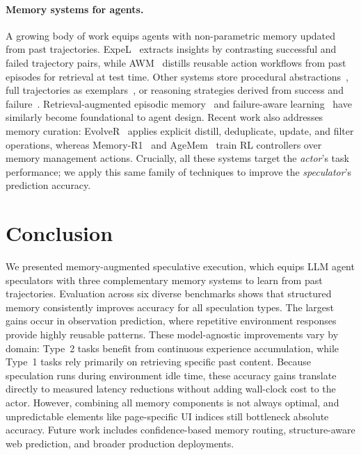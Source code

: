 \documentclass{article}
\begin{document}
\paragraph{Memory systems for agents.}
\label{sec:related:memory}
A growing body of work equips agents with non-parametric memory updated from past trajectories. ExpeL~\citep{zhao2024expel} extracts insights by contrasting successful and failed trajectory pairs, while AWM~\citep{wang2024awm} distills reusable action workflows from past episodes for retrieval at test time. Other systems store procedural abstractions~\citep{fang2025memp,wang2023voyager}, full trajectories as exemplars~\citep{zheng2024synapse,kagaya2024rap,sarukkai2025self}, or reasoning strategies derived from success and failure~\citep{ouyang2025reasoningbank}. Retrieval-augmented episodic memory~\citep{lewis2020rag,park2023generative,majumder2023clin,zhang2026memrl} and failure-aware learning~\citep{shinn2023reflexion,ding2026agenther,allard2026erl} have similarly become foundational to agent design. Recent work also addresses memory curation: EvolveR~\citep{wu2025evolver} applies explicit distill, deduplicate, update, and filter operations, whereas Memory-R1~\citep{yan2025memory} and AgeMem~\citep{yu2026agentic} train RL controllers over memory management actions. Crucially, all these systems target the \emph{actor}'s task performance; we apply this same family of techniques to improve the \emph{speculator}'s prediction accuracy.


\section{Conclusion}
\label{sec:conclusion}
We presented memory-augmented speculative execution, which equips LLM agent speculators with three complementary memory systems to learn from past trajectories. Evaluation across six diverse benchmarks shows that structured memory consistently improves accuracy for all speculation types. The largest gains occur in observation prediction, where repetitive environment responses provide highly reusable patterns. These model-agnostic improvements vary by domain: Type~2 tasks benefit from continuous experience accumulation, while Type~1 tasks rely primarily on retrieving specific past content. Because speculation runs during environment idle time, these accuracy gains translate directly to measured latency reductions without adding wall-clock cost to the actor. However, combining all memory components is not always optimal, and unpredictable elements like page-specific UI indices still bottleneck absolute accuracy. Future work includes confidence-based memory routing, structure-aware web prediction, and broader production deployments.
\end{document}
